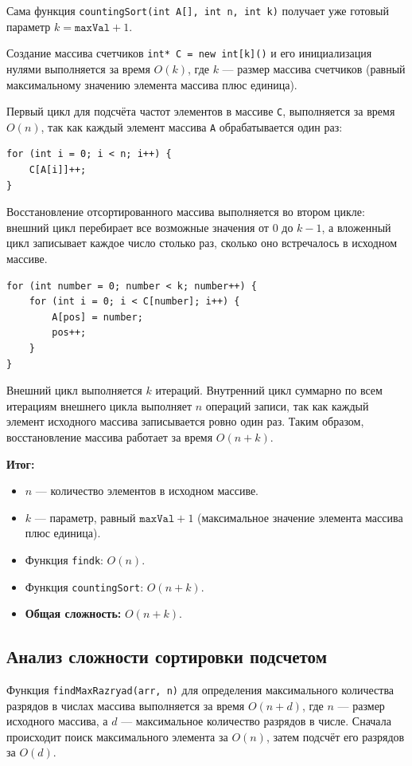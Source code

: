 \documentclass[otchet]{SCWorks}
\begin{document}
Сама функция \texttt{countingSort(int A[], int n, int k)} получает уже готовый параметр $k = \texttt{maxVal} + 1$.

Создание массива счетчиков \texttt{int* C = new int[k]()} и его инициализация нулями выполняется за время $O(k)$, где $k$ — размер массива счетчиков (равный максимальному значению элемента массива плюс единица).

Первый цикл для подсчёта частот элементов в массиве \texttt{C}, выполняется за время $O(n)$, так как каждый элемент массива \texttt{A} обрабатывается один раз:
\begin{verbatim}
for (int i = 0; i < n; i++) {
    C[A[i]]++;
}
\end{verbatim}


Восстановление отсортированного массива выполняется во втором цикле: внешний цикл перебирает все возможные значения от $0$ до $k-1$, а вложенный цикл записывает каждое число столько раз, сколько оно встречалось в исходном массиве.
\begin{verbatim}
for (int number = 0; number < k; number++) {
    for (int i = 0; i < C[number]; i++) {
        A[pos] = number;
        pos++;
    }
}
\end{verbatim}
Внешний цикл выполняется $k$ итераций. Внутренний цикл суммарно по всем итерациям внешнего цикла выполняет $n$ операций записи, так как каждый элемент исходного массива записывается ровно один раз. Таким образом, восстановление массива работает за время $O(n + k)$.


\textbf{Итог:}
\begin{itemize}
    \item $n$ — количество элементов в исходном массиве.
    \item $k$ — параметр, равный $\texttt{maxVal} + 1$ (максимальное значение элемента массива плюс единица).
    \item Функция \texttt{findk}: $O(n)$.
    \item Функция \texttt{countingSort}: $O(n + k)$.
    \item \textbf{Общая сложность:} $O(n + k)$.
\end{itemize}

\subsection{Анализ сложности сортировки подсчетом}
Функция \texttt{findMaxRazryad(arr, n)} для определения максимального количества разрядов в числах массива выполняется за время $O(n + d)$, где $n$ — размер исходного массива, а $d$ — максимальное количество разрядов в числе. Сначала происходит поиск максимального элемента за $O(n)$, затем подсчёт его разрядов за $O(d)$.
\end{document}
